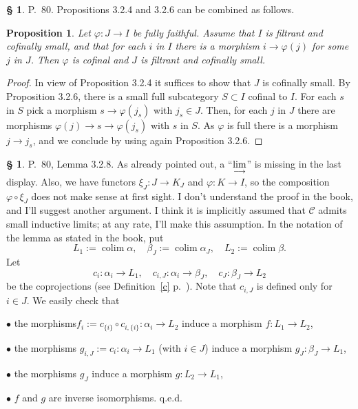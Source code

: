 \documentclass[12pt]{article}
\newtheorem{prop}[thm]{Proposition}
\theoremstyle{remark}
\theoremstyle{definition}
\newtheorem{s}[thm]{\S}
\newcommand{\bu}{\bullet}
\newcommand{\C}{\mathcal C}
\newcommand{\colim}{\operatornamewithlimits{\underset{\longrightarrow}{lim}}}
\DeclareMathOperator*{\coli}{colim}
\begin{document}
\begin{s} 
P.~80. Propositions 3.2.4 and 3.2.6 can be combined as follows. 

\begin{prop}\label{comb} 
Let $\varphi:J\to I$ be fully faithful. Assume that $I$ is filtrant and cofinally small, and that for each $i$ in $I$ there is a morphism $i\to\varphi(j)$ for some $j$ in $J$. Then $\varphi$ is cofinal and $J$ is filtrant and cofinally small. 
\end{prop} 

\begin{proof}
In view of Proposition 3.2.4 it suffices to show that $J$ is cofinally small. By Proposition 3.2.6, there is a small full subcategory $S\subset I$ cofinal to $I$. For each $s$ in $S$ pick a morphism $s\to\varphi(j_s)$ with $j_s\in J$. Then, for each $j$ in $J$ there are morphisms $\varphi(j)\to s\to\varphi(j_s)$ with $s$ in $S$. As $\varphi$ is full there is a morphism $j\to j_s$, and we conclude by using again Proposition 3.2.6.
\end{proof}
\end{s}
%
%
\begin{s} 
P.~80, Lemma 3.2.8. As already pointed out, a ``$\displaystyle\colim$'' is missing in the last display. Also, we have functors $\xi_J:J\to K_J$ and $\varphi:K\to I$, so the composition $\varphi\circ\xi_J$ does not make sense at first sight. I don't understand the proof in the book, and I'll suggest another argument. I think it is implicitly assumed that $\C$ admits small inductive limits; at any rate, I'll make this assumption. In the notation of the lemma as stated in the book, put 
$$
L_1:=\coli\alpha,\quad
\beta_J:=\coli\alpha_J,\quad
L_2:=\coli\beta.
$$
Let 
$$
c_i:\alpha_i\to L_1,\quad 
c_{i,J}:\alpha_i\to\beta_J,\quad 
c_J:\beta_J\to L_2
$$
be the coprojections (see Definition~\ref{c} p.~\pageref{c}). Note that $c_{i,J}$ is defined only for $i\in J$. We easily check that 

\noindent$\bu$ the morphisms$f_i:=c_{\{i\}}\circ c_{i,\{i\}}:\alpha_i\to L_2$ induce a morphism $f:L_1\to L_2$, 

\noindent$\bu$ the morphisms $g_{i,J}:=c_i:\alpha_i\to L_1$ (with $i\in J$) induce a morphism $g_J:\beta_J\to L_1$, 

\noindent$\bu$ the morphisms $g_J$ induce a morphism $g:L_2\to L_1$, 

\noindent$\bu$ $f$ and $g$ are inverse isomorphisms. q.e.d.
\end{s}
%
%
\end{document}
